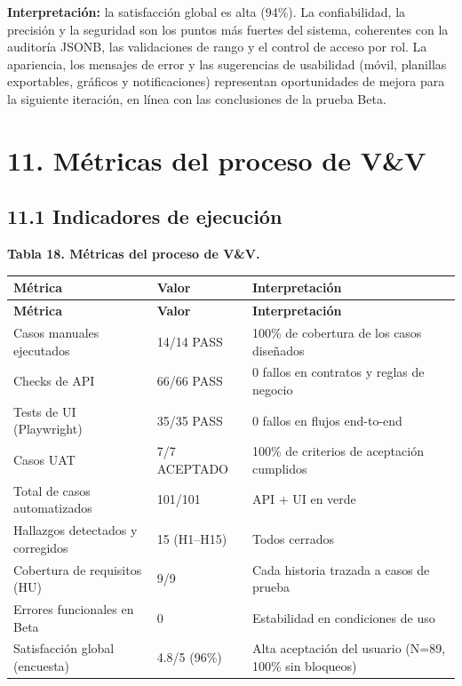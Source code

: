 \documentclass[11pt,a4paper]{article}
\begin{document}
\textbf{Interpretación:} la satisfacción global es alta (94\%). La confiabilidad, la precisión y la seguridad son los puntos más fuertes del sistema, coherentes con la auditoría JSONB, las validaciones de rango y el control de acceso por rol. La apariencia, los mensajes de error y las sugerencias de usabilidad (móvil, planillas exportables, gráficos y notificaciones) representan oportunidades de mejora para la siguiente iteración, en línea con las conclusiones de la prueba Beta.


\section*{11. Métricas del proceso de V\&V}


\subsection*{11.1 Indicadores de ejecución}


\textbf{Tabla 18. Métricas del proceso de V\&V.}


{\small
\begin{longtable}{|p{}|p{}|p{}|}
\rowcolor{UTECblue}\color{white}\bfseries Métrica & \color{white}\bfseries Valor & \color{white}\bfseries Interpretación \\ \hline
\endfirsthead
\rowcolor{UTECblue}\color{white}\bfseries Métrica & \color{white}\bfseries Valor & \color{white}\bfseries Interpretación \\ \hline
\endhead
Casos manuales ejecutados & 14/14 PASS & 100\% de cobertura de los casos diseñados \\ \hline
Checks de API & 66/66 PASS & 0 fallos en contratos y reglas de negocio \\ \hline
Tests de UI (Playwright) & 35/35 PASS & 0 fallos en flujos end-to-end \\ \hline
Casos UAT & 7/7 ACEPTADO & 100\% de criterios de aceptación cumplidos \\ \hline
Total de casos automatizados & 101/101 & API + UI en verde \\ \hline
Hallazgos detectados y corregidos & 15 (H1--H15) & Todos cerrados \\ \hline
Cobertura de requisitos (HU) & 9/9 & Cada historia trazada a casos de prueba \\ \hline
Errores funcionales en Beta & 0 & Estabilidad en condiciones de uso \\ \hline
Satisfacción global (encuesta) & 4.8/5 (96\%) & Alta aceptación del usuario (N=89, 100\% sin bloqueos) \\ \hline
\end{longtable}}
\end{document}
